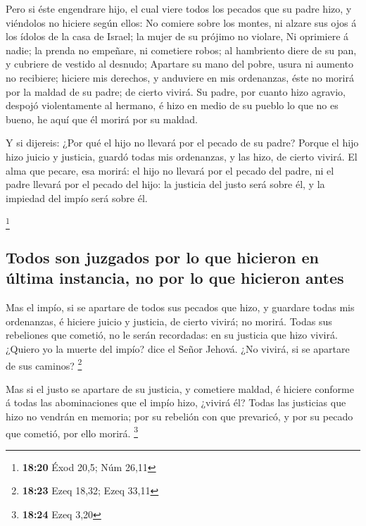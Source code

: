 Pero si éste engendrare hijo, el cual viere todos los
pecados que su padre hizo, y viéndolos no hiciere según ellos:
 No comiere sobre los montes, ni alzare sus ojos á los
ídolos de la casa de Israel; la mujer de su prójimo no violare,
 Ni oprimiere á nadie; la prenda no empeñare, ni cometiere
robos; al hambriento diere de su pan, y cubriere de vestido al desnudo;
 Apartare su mano del pobre, usura ni aumento no recibiere;
hiciere mis derechos, y anduviere en mis ordenanzas, éste no morirá por
la maldad de su padre; de cierto vivirá.  Su padre, por
cuanto hizo agravio, despojó violentamente al hermano, é hizo en medio
de su pueblo lo que no es bueno, he aquí que él morirá por su maldad.

 Y si dijereis: ¿Por qué el hijo no llevará por el pecado
de su padre? Porque el hijo hizo juicio y justicia, guardó todas mis
ordenanzas, y las hizo, de cierto vivirá.  El alma que
pecare, esa morirá: el hijo no llevará por el pecado del padre, ni el
padre llevará por el pecado del hijo: la justicia del justo será sobre
él, y la impiedad del impío será sobre él.

\footnote{\textbf{18:20} Éxod 20,5; Núm 26,11}

\hypertarget{todos-son-juzgados-por-lo-que-hicieron-en-uxfaltima-instancia-no-por-lo-que-hicieron-antes}{%
\subsection{Todos son juzgados por lo que hicieron en última instancia,
no por lo que hicieron
antes}\label{todos-son-juzgados-por-lo-que-hicieron-en-uxfaltima-instancia-no-por-lo-que-hicieron-antes}}

 Mas el impío, si se apartare de todos sus pecados que
hizo, y guardare todas mis ordenanzas, é hiciere juicio y justicia, de
cierto vivirá; no morirá.  Todas sus rebeliones que
cometió, no le serán recordadas: en su justicia que hizo vivirá.
 ¿Quiero yo la muerte del impío? dice el Señor Jehová. ¿No
vivirá, si se apartare de sus caminos? \footnote{\textbf{18:23} Ezeq
  18,32; Ezeq 33,11}

 Mas si el justo se apartare de su justicia, y cometiere
maldad, é hiciere conforme á todas las abominaciones que el impío hizo,
¿vivirá él? Todas las justicias que hizo no vendrán en memoria; por su
rebelión con que prevaricó, y por su pecado que cometió, por ello
morirá. \footnote{\textbf{18:24} Ezeq 3,20}

